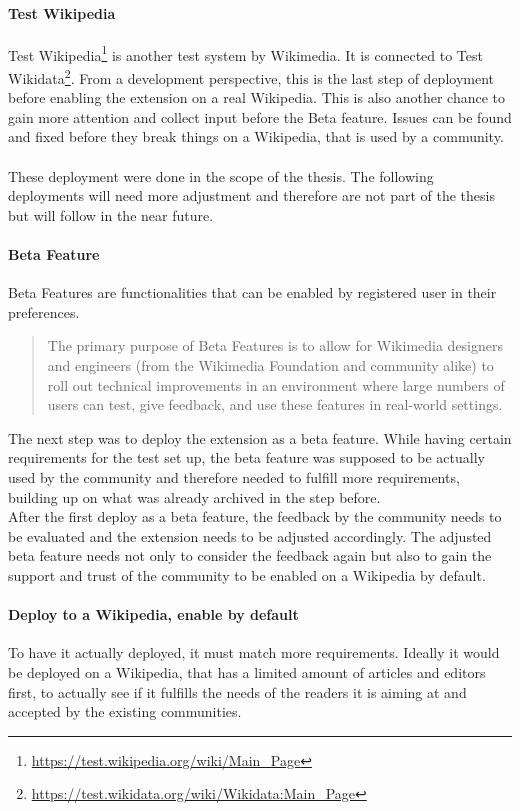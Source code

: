 \paragraph{Test Wikipedia}
Test Wikipedia\footnote{\url{https://test.wikipedia.org/wiki/Main_Page}} is another test system by Wikimedia. It is connected to Test Wikidata\footnote{\url{https://test.wikidata.org/wiki/Wikidata:Main_Page}}. From a development perspective, this is the last step of deployment before enabling the extension on a real Wikipedia. This is also another chance to gain more attention and collect input before the Beta feature. Issues can be found and fixed before they break things on a Wikipedia, that is used by a community. \\
\\
These deployment were done in the scope of the thesis. The following deployments will need more adjustment and therefore are not part of the thesis but will follow in the near future. 

\paragraph{Beta Feature}
Beta Features are functionalities that can be enabled by registered user in their preferences. 
\begin{quotation}
	The primary purpose of Beta Features is to allow for Wikimedia designers and engineers (from the Wikimedia Foundation and community alike) to roll out technical improvements in an environment where large numbers of users can test, give feedback, and use these features in real-world settings.
\end{quotation} \citep{wiki:04}

The next step was to deploy the extension as a beta feature. While having certain requirements for the test set up, the beta feature was supposed to be actually used by the community and therefore needed to fulfill more requirements, building up on what was already archived in the step before. \\
After the first deploy as a beta feature, the feedback by the community needs to be evaluated and the extension needs to be adjusted accordingly. The adjusted beta feature needs not only to consider the feedback again but also to gain the support and trust of the community to be enabled on a Wikipedia by default.

\paragraph{Deploy to a Wikipedia, enable by default}
To have it actually deployed, it must match more requirements. Ideally it would be deployed on a Wikipedia, that has a limited amount of articles and editors first, to actually see if it fulfills the needs of the readers it is aiming at and accepted by the existing communities. 

